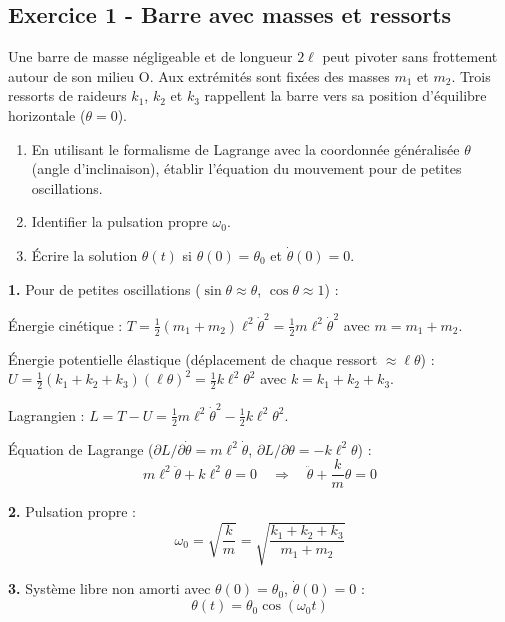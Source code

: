 \documentclass[12pt,a4paper]{article}
\begin{document}
\subsection*{Exercice 1 - Barre avec masses et ressorts \niveau{\facile}}

\begin{boiteexercice}
Une barre de masse négligeable et de longueur $2\ell$ peut pivoter sans frottement autour de son milieu O. Aux extrémités sont fixées des masses $m_1$ et $m_2$. Trois ressorts de raideurs $k_1$, $k_2$ et $k_3$ rappellent la barre vers sa position d'équilibre horizontale ($\theta = 0$).
\begin{enumerate}
  \item En utilisant le formalisme de Lagrange avec la coordonnée généralisée $\theta$ (angle d'inclinaison), établir l'équation du mouvement pour de petites oscillations.
  \item Identifier la pulsation propre $\omega_0$.
  \item Écrire la solution $\theta(t)$ si $\theta(0) = \theta_0$ et $\dot{\theta}(0) = 0$.
\end{enumerate}
\end{boiteexercice}

\begin{boitecorrige}
\textbf{1.} Pour de petites oscillations ($\sin\theta\approx\theta$, $\cos\theta\approx 1$) :

Énergie cinétique : $T = \frac{1}{2}(m_1+m_2)\ell^2\dot\theta^2 = \frac{1}{2}m\ell^2\dot\theta^2$ avec $m=m_1+m_2$.

Énergie potentielle élastique (déplacement de chaque ressort $\approx \ell\theta$) :
$U = \frac{1}{2}(k_1+k_2+k_3)(\ell\theta)^2 = \frac{1}{2}k\ell^2\theta^2$ avec $k = k_1+k_2+k_3$.

Lagrangien : $L = T-U = \frac{1}{2}m\ell^2\dot\theta^2 - \frac{1}{2}k\ell^2\theta^2$.

Équation de Lagrange ($\partial L/\partial\dot\theta = m\ell^2\dot\theta$, $\partial L/\partial\theta = -k\ell^2\theta$) :
\[
m\ell^2\ddot\theta + k\ell^2\theta = 0 \quad\Longrightarrow\quad \ddot\theta + \frac{k}{m}\theta = 0
\]

\textbf{2.} Pulsation propre :
\[
\omega_0 = \sqrt{\frac{k}{m}} = \sqrt{\frac{k_1+k_2+k_3}{m_1+m_2}}
\]

\textbf{3.} Système libre non amorti avec $\theta(0)=\theta_0$, $\dot\theta(0)=0$ :
\[
\theta(t) = \theta_0\cos(\omega_0 t)
\]
\end{boitecorrige}
\end{document}
